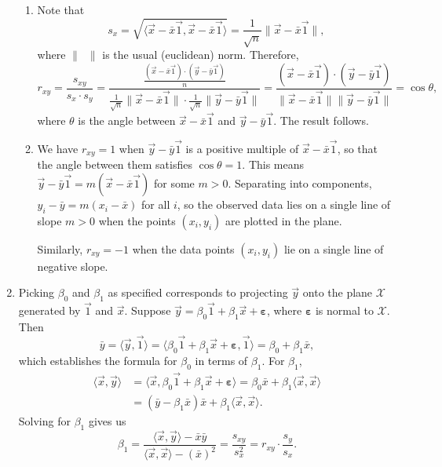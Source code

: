 \begin{enumerate}
\begin{enumerate}
\item Note that
\begin{equation*}
s_x = \sqrt{\langle\vec{x} - \bar{x}\vec{1}, \vec{x} - \bar{x}\vec{1}\rangle} = \frac{1}{\sqrt{n}}\|\vec{x} - \bar{x}\vec{1}\|,
\end{equation*}
where $\|\phantom{x}\|$ is the usual (euclidean) norm. Therefore,
\begin{equation*}
r_{xy} = \frac{s_{xy}}{s_x\cdot s_y} = \frac{\frac{(\vec{x} - \bar{x}\vec{1})\cdot (\vec{y} - \bar{y}\vec{1})}{n}}{\frac{1}{\sqrt{n}}\|\vec{x} - \bar{x}\vec{1}\|\cdot\frac{1}{\sqrt{n}}\|\vec{y} - \bar{y}\vec{1}\|} = \frac{(\vec{x} - \bar{x}\vec{1})\cdot (\vec{y} - \bar{y}\vec{1})}{\|\vec{x} - \bar{x}\vec{1}\|\|\vec{y} - \bar{y}\vec{1}\|} = \cos\theta,
\end{equation*}
where $\theta$ is the angle between $\vec{x} - \bar{x}\vec{1}$ and $\vec{y} - \bar{y}\vec{1}$. The result follows.
\item We have $r_{xy} = 1$ when $\vec{y} - \bar{y}\vec{1}$ is a positive multiple of $\vec{x} - \bar{x}\vec{1}$, so that the angle between them satisfies $\cos\theta = 1$. This means $\vec{y} - \bar{y}\vec{1} = m(\vec{x} - \bar{x}\vec{1})$ for some $m > 0$. Separating into components, $y_i - \bar{y} = m(x_i - \bar{x})$ for all $i$, so the observed data lies on a single line of slope $m > 0$ when the points $(x_i,y_i)$ are plotted in the plane.\par
Similarly, $r_{xy} = -1$ when the data points $(x_i,y_i)$ lie on a single line of negative slope.
\end{enumerate}
\item Picking $\beta_0$ and $\beta_1$ as specified corresponds to projecting $\vec{y}$ onto the plane $\mathcal{X}$ generated by $\vec{1}$ and $\vec{x}$. Suppose $\vec{y} = \beta_0\vec{1} + \beta_1\vec{x} + \boldsymbol\varepsilon$, where $\boldsymbol\varepsilon$ is normal to $\mathcal{X}$. Then
\begin{equation*}
\bar{y} = \langle\vec{y},\vec{1}\rangle = \langle\beta_0\vec{1} + \beta_1\vec{x} + \boldsymbol\varepsilon, \vec{1}\rangle = \beta_0 + \beta_1\bar{x},
\end{equation*}
which establishes the formula for $\beta_0$ in terms of $\beta_1$. For $\beta_1$,
\begin{align*}
\langle\vec{x},\vec{y}\rangle &= \langle\vec{x}, \beta_0\vec{1} + \beta_1\vec{x} + \boldsymbol\varepsilon\rangle = \beta_0\bar{x} + \beta_1\langle\vec{x},\vec{x}\rangle \\
&= (\bar{y} - \beta_1\bar{x})\bar{x} + \beta_1\langle\vec{x},\vec{x}\rangle.
\end{align*}
Solving for $\beta_1$ gives us
\begin{equation*}
\beta_1 = \frac{\langle\vec{x},\vec{y}\rangle - \bar{x}\bar{y}}{\langle\vec{x},\vec{x}\rangle - (\bar{x})^2} = \frac{s_{xy}}{s_x^2} = r_{xy}\cdot\frac{s_y}{s_x}.
\end{equation*}
\end{enumerate}